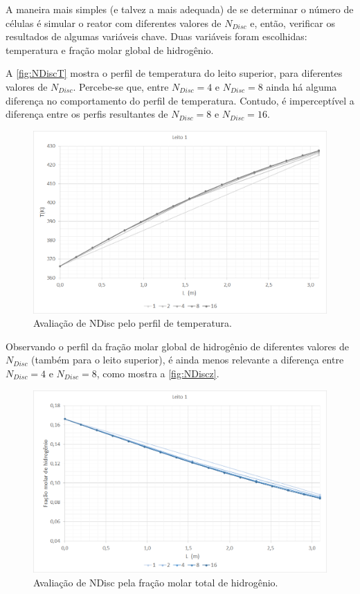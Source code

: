 A maneira mais simples (e talvez a mais adequada) de se determinar o número de
células é simular o reator com diferentes valores de $N_{Disc}$ e, então,
verificar os resultados de algumas variáveis chave. Duas variáveis
foram escolhidas: temperatura e fração molar global de hidrogênio.

A \autoref{fig:NDiscT} mostra o perfil de temperatura do leito superior, para
diferentes valores de $N_{Disc}$. Percebe-se que, entre $N_{Disc} = 4$ e
$N_{Disc} = 8$ ainda há alguma diferença no comportamento do perfil de
temperatura. Contudo, é imperceptível a diferença entre os perfis resultantes de
$N_{Disc} = 8$ e $N_{Disc} = 16$. 

\begin{figure}[htb] \centering
\includegraphics[scale=0.4]{images/Chap4/NDiscT.png}
\caption{Avaliação de NDisc pelo perfil de temperatura.}
\label{fig:NDiscT}
\end{figure}

Observando o perfil da fração molar global de hidrogênio de diferentes valores
de $N_{Disc}$ (também para o leito superior), é ainda menos relevante a
diferença entre $N_{Disc} = 4$ e $N_{Disc} = 8$, como mostra a
\autoref{fig:NDiscz}.

\begin{figure}[htb]
\centering \includegraphics[scale=0.4]{images/Chap4/NDiscz.png}
\caption{Avaliação de NDisc pela fração molar total de hidrogênio.}
\label{fig:NDiscz}
\end{figure}

